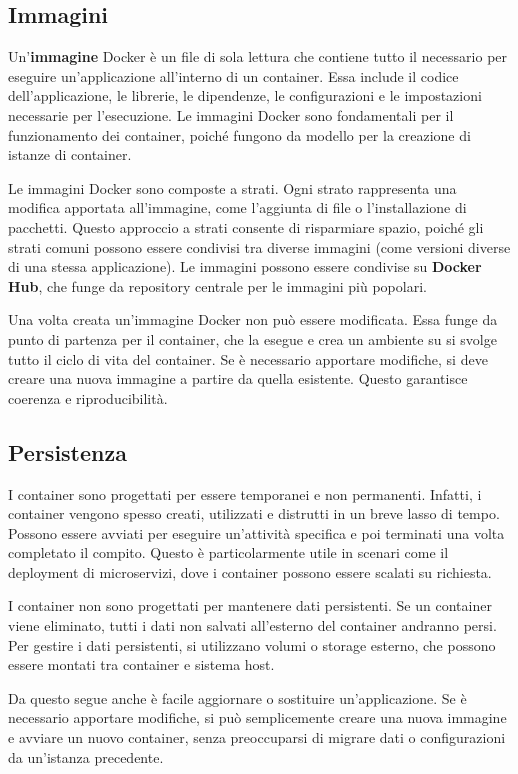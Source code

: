 \subsection{Immagini}
Un'\textbf{immagine} Docker è un file di sola lettura che contiene tutto il necessario per eseguire un'applicazione all'interno di un container. Essa include il codice dell'applicazione, le librerie, le dipendenze, le configurazioni e le impostazioni necessarie per l'esecuzione. Le immagini Docker sono fondamentali per il funzionamento dei container, poiché fungono da modello per la creazione di istanze di container.

Le immagini Docker sono composte a strati. Ogni strato rappresenta una modifica apportata all'immagine, come l'aggiunta di file o l'installazione di pacchetti. Questo approccio a strati consente di risparmiare spazio, poiché gli strati comuni possono essere condivisi tra diverse immagini (come versioni diverse di una stessa applicazione). Le immagini possono essere condivise su \textbf{Docker Hub}, che funge da repository centrale per le immagini più popolari.

Una volta creata un'immagine Docker non può essere modificata. Essa funge da punto di partenza per il container, che la esegue e crea un ambiente su si svolge tutto il ciclo di vita del container. Se è necessario apportare modifiche, si deve creare una nuova immagine a partire da quella esistente. Questo garantisce coerenza e riproducibilità.

\subsection{Persistenza}
I container sono progettati per essere temporanei e non permanenti. Infatti, i container vengono spesso creati, utilizzati e distrutti in un breve lasso di tempo. Possono essere avviati per eseguire un'attività specifica e poi terminati una volta completato il compito. Questo è particolarmente utile in scenari come il deployment di microservizi, dove i container possono essere scalati su richiesta.

I container non sono progettati per mantenere dati persistenti. Se un container viene eliminato, tutti i dati non salvati all'esterno del container andranno persi. Per gestire i dati persistenti, si utilizzano volumi o storage esterno, che possono essere montati tra container e sistema host.

Da questo segue anche è facile aggiornare o sostituire un'applicazione. Se è necessario apportare modifiche, si può semplicemente creare una nuova immagine e avviare un nuovo container, senza preoccuparsi di migrare dati o configurazioni da un'istanza precedente.

